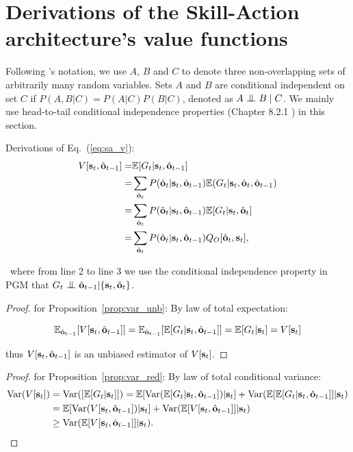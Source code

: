 \section{Derivations of the Skill-Action architecture's value
  functions}
\label{sec:appen_sa_v_proof}

Following 's notation, we use $A$,
$B$ and $C$ to denote three non-overlapping sets of arbitrarily
many random variables. Sets $A$ and $B$ are conditional
independent on set $C$ if $P(A,B|C)=P(A|C)P(B|C)$, denoted as
$A\bigCI B \;|\; C$. We mainly use head-to-tail conditional
independence properties (Chapter 8.2.1 \cite{bishop2006pattern})
in this section.

Derivations of Eq.~(\ref{eq:sa_v}):
\begin{align*}
  V[{\mathbf{s}}_t,\hat{{\mathbf{o}}}_{t-1}]=&\mathbb{E}[G_t|{\mathbf{s}}_t,\hat{{\mathbf{o}}}_{t-1}]\\
  =& \sum_{\hat{{\mathbf{o}}}_t}P(\hat{{\mathbf{o}}}_t|{\mathbf{s}}_t,\hat{{\mathbf{o}}}_{t-1})\mathbb{E}(G_t|{\mathbf{s}}_t,\hat{{\mathbf{o}}}_t,\hat{{\mathbf{o}}}_{t-1})\\
  =& \sum_{\hat{{\mathbf{o}}}_t}P(\hat{{\mathbf{o}}}_t|{\mathbf{s}}_t,\hat{{\mathbf{o}}}_{t-1})\mathbb{E}[ G_t|{\mathbf{s}}_t,\hat{{\mathbf{o}}}_t ]\\
  =& \sum_{\hat{{\mathbf{o}}}_t}P(\hat{{\mathbf{o}}}_t|{\mathbf{s}}_t,\hat{{\mathbf{o}}}_{t-1})Q_O[ \hat{{\mathbf{o}}}_t,{\mathbf{s}}_t],
\end{align*}

~where from line 2 to line 3 we use the conditional independence
property in PGM that $G_t\bigCI\hat{\rvo}_{t-1}|\{\rvs_t,\hat{\rvo}_t\}$.
\begin{proof}
 for Proposition~\ref{prop:var_unb}: By law of total expectation:

  $$\mathbb{E}_{\hat{{\mathbf{o}}}_{t-1}}[V[{\mathbf{s}}_t,\hat{{\mathbf{o}}}_{t-1}]]=\mathbb{E}_{\hat{{\mathbf{o}}}_{t-1}}[\mathbb{E}[G_t|{\mathbf{s}}_t,\hat{{\mathbf{o}}}_{t-1}]]=\mathbb{E}[G_t|{\mathbf{s}}_t] = V[{\mathbf{s}}_t]$$

thus $V[{\mathbf{s}}_t,\hat{{\mathbf{o}}}_{t-1}]$ is an unbiased estimator of $V[{\mathbf{s}}_t]$.
\end{proof}

\begin{proof}
  for Proposition~\ref{prop:var_red}: By law of total conditional
  variance:
\begin{align*}
  \text{Var}(V[{\mathbf{s}}_t]) &= \text{Var}([\mathbb{E}[G_t|{\mathbf{s}}_t]]) =\mathbb{E}[\text{Var}(\mathbb{E}[G_t|{\mathbf{s}}_t,\hat{{\mathbf{o}}}_{t-1}])|{\mathbf{s}}_t]+\text{Var}(\mathbb{E}[\mathbb{E}[G_t|{\mathbf{s}}_t,\hat{{\mathbf{o}}}_{t-1}]]|{\mathbf{s}}_t)\\
                        &= \mathbb{E}[\text{Var}(V[{\mathbf{s}}_t,\hat{{\mathbf{o}}}_{t-1}])|{\mathbf{s}}_t]+\text{Var}(\mathbb{E}[V[{\mathbf{s}}_t,\hat{{\mathbf{o}}}_{t-1}]]|{\mathbf{s}}_t)\\
  &\geq \text{Var}(\mathbb{E}[V[{\mathbf{s}}_t,\hat{{\mathbf{o}}}_{t-1}]]|{\mathbf{s}}_t).
\end{align*}
\end{proof}

